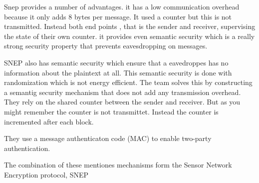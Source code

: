 \tiny
Snep provides a number of advantages. it has a low communication overhead because it only adds 8 bytes per message. It used a counter but this is not transmitted. Instead both end points , that is the sender and receiver, supervising the state of their own counter. it provides even semantic security which is a really strong security property that prevents eavesdropping on messages.

\bigskip


SNEP also has semantic security which ensure that a eavedroppes has no information about the plaintext at all. This semantic security is done with randomization which is not energy efficient. The team solves this by constructing a semantig security mechanism that does not add any transmission overhead. They rely on the shared counter between the sender and receiver. But as you might remember the counter is not transmittet. Instead the counter is incremented after each block.

\bigskip


They use a message authenticaton code (MAC) to enable two-party authentication.

\bigskip

The combination of these mentiones mechanisms form the Sensor Network Encryption protocol, SNEP